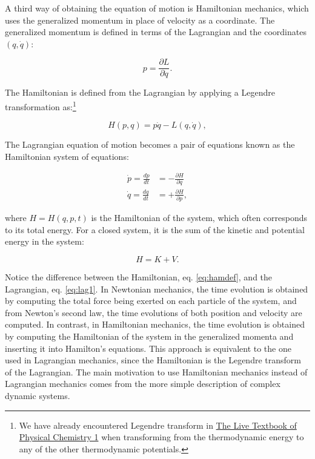 \documentclass[
  9pt,
]{extbook}
\theoremstyle{definition}
\theoremstyle{definition}
\theoremstyle{definition}
\theoremstyle{remark}
\begin{document}
A third way of obtaining the equation of motion is Hamiltonian mechanics, which uses the generalized momentum in place of velocity as a coordinate. The generalized momentum is defined in terms of the Lagrangian and the coordinates \((q,\dot{q})\):

\begin{equation} 
p = \frac{\partial L}{\partial\dot q}.
\label{eq:ham1}
\end{equation}

The Hamiltonian is defined from the Lagrangian by applying a Legendre transformation as:\footnote{We have already encountered Legendre transform in \href{https://peverati.github.io/pchem1/Potentials.html\#thermpot}{The Live Textbook of Physical Chemistry 1} when transforming from the thermodynamic energy to any of the other thermodynamic potentials.}

\begin{equation} 
H(p,q) = p\dot{q} - L(q,\dot{q}),
\label{eq:ham2}
\end{equation}

The Lagrangian equation of motion becomes a pair of equations known as the Hamiltonian system of equations:

\begin{equation} 
\begin{aligned}
\dot{p}=\frac{dp}{dt} &= -\frac{\partial H}{\partial q} \\
\dot{q}=\frac{dq}{dt} &= +\frac{\partial H}{\partial p},
\end{aligned}
\label{eq:ham3}
\end{equation}

where \(H=H(q,p,t)\) is the Hamiltonian of the system, which often corresponds to its total energy. For a closed system, it is the sum of the kinetic and potential energy in the system:

\begin{equation}
H = K + V.
\label{eq:hamdef}
\end{equation}

Notice the difference between the Hamiltonian, eq. \eqref{eq:hamdef}, and the Lagrangian, eq. \eqref{eq:lag1}. In Newtonian mechanics, the time evolution is obtained by computing the total force being exerted on each particle of the system, and from Newton's second law, the time evolutions of both position and velocity are computed. In contrast, in Hamiltonian mechanics, the time evolution is obtained by computing the Hamiltonian of the system in the generalized momenta and inserting it into Hamilton's equations. This approach is equivalent to the one used in Lagrangian mechanics, since the Hamiltonian is the Legendre transform of the Lagrangian. The main motivation to use Hamiltonian mechanics instead of Lagrangian mechanics comes from the more simple description of complex dynamic systems.
\end{document}
